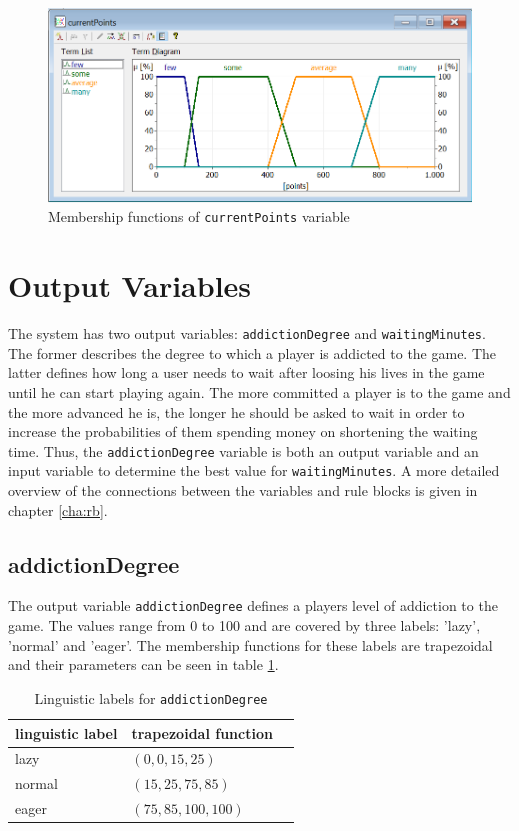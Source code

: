 \begin{figure}[H]
\centering
\includegraphics[width=\textwidth]{img/vCurrentPoints}
\caption{Membership functions of \texttt{currentPoints} variable}
\label{fig:currentPoints} 
\end{figure}

\section{Output Variables}

The system has two output variables: \texttt{addictionDegree} and \texttt{waitingMinutes}. The former describes the degree to which a player is addicted to the game. The latter defines how long a user needs to wait after loosing his lives in the game until he can start playing again. The more committed a player is to the game and the more advanced he is, the longer he should be asked to wait in order to increase the probabilities of them spending money on shortening the waiting time. Thus, the \texttt{addictionDegree} variable is both an output variable and an input variable to determine the best value for \texttt{waitingMinutes}. A more detailed overview of the connections between the variables and rule blocks is given in chapter \ref{cha:rb}.

\subsection{addictionDegree}

The output variable \texttt{addictionDegree} defines a players level of addiction to the game. The values range from 0 to 100 and are covered by three labels: 'lazy', 'normal' and 'eager'. The membership functions for these labels are trapezoidal and their parameters can be seen in table \ref{tab:addictionDegree}.

\begin{table}[H]
\centering
\begin{tabular}{@{}lll@{}}
\toprule
\textbf{linguistic label}  & \textbf{trapezoidal function} \\ 
\midrule
lazy  & $(0,0,15,25)$ \\
normal & $(15,25,75,85)$ \\
eager & $(75,85,100,100)$ \\
\bottomrule
\end{tabular}
\caption{Linguistic labels for \texttt{addictionDegree}}
\label{tab:addictionDegree}
\end{table}

